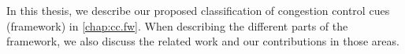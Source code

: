 
In this thesis, we describe our proposed classification of congestion control
cues (framework) in \ref{chap:cc.fw}. When describing the different parts of the
framework, we also discuss the related work and our contributions in those
areas. 




